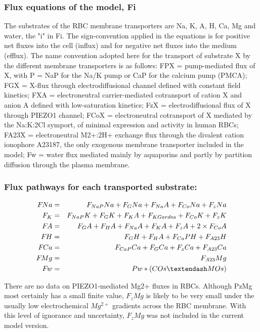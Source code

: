 \documentclass[a4paper]{article}
\newcommand{\med}[1]{M#1}
\newcommand{\cell}[1]{C#1}
\newcommand{\MOs}{\med{Os}}
\newcommand{\COs}{\cell{Os}}
\newcommand{\F}[2]{F_{#1}#2}
\begin{document}
\subsubsection{Flux equations of the model, Fi}
The substrates of the RBC membrane transporters are Na, K, A, H, Ca, Mg and water, the "i" in Fi.  The sign-convention applied in the equations is for positive net fluxes into the cell (influx) and for negative net fluxes into the medium (efflux). The name convention adopted here for the transport of substrate X by the different membrane transporters is as follows: FPX = pump-mediated flux of X, with P = NaP for the Na/K pump or CaP for the calcium pump (PMCA); FGX = X-flux through electrodiffusional channel defined with constant field kinetics; FXA = electroneutral carrier-mediated cotransport of cation X and anion A defined with low-saturation kinetics; FzX = electrodiffusional flux of X through PIEZO1 channel; FCoX = electroneutral cotransport of X mediated by the Na:K:2Cl symport, of minimal expression and activity in human RBCs; FA23X = electroneutral M2+:2H+ exchange flux through the divalent cation ionophore A23187, the only exogenous membrane transporter included in the model; Fw = water flux mediated mainly by aquaporins and partly by partition diffusion through the plasma membrane.  

\setcounter{equation}{0}
\renewcommand{\theequation}{10.\alph{equation}}

\subsubsection{Flux pathways for each transported substrate:}
\begin{eqnarray}
\F{}{Na} &=& \F{NaP}{Na} + \F{G}{Na} + \F{Na}{A} + \F{Co}{Na} + \F{z}{Na}\\
\F{K} &=& \F{NaP}{K} + \F{G}{K} + \F{K}{A} + \F{KGardos} + \F{Co}{K} + \F{z}{K}\\
\F{}{A} &=& \F{G}{A} + \F{H}{A} + \F{Na}{A} + \F{K}{A} + \F{z}{A} + 2\times\F{Co}{A}\\
\F{}{H} &=& \F{G}{H} + \F{H}{A} + \F{Ca}{PH} + \F{A23}{H} \\
\F{}{Ca} &=& \F{CaP}{Ca} + \F{G}{Ca} + \F{z}{Ca} + \F{A23}{Ca} \\
\F{}{Mg} &=& \F{A23}{Mg} \\
\F{}{w}  &=& Pw*(\COs – \MOs)
\end{eqnarray}

There are no data on PIEZO1-mediated Mg2+ fluxes in RBCs.  Although PzMg most certainly has a small finite value, $\F{z}{Mg}$ is likely to be very small under the usually low electrochemical $Mg^{2+}$ gradients across the RBC membrane.  With this level of ignorance and uncertainty, $\F{z}{Mg}$ was not included in the current model version.  
\end{document}
